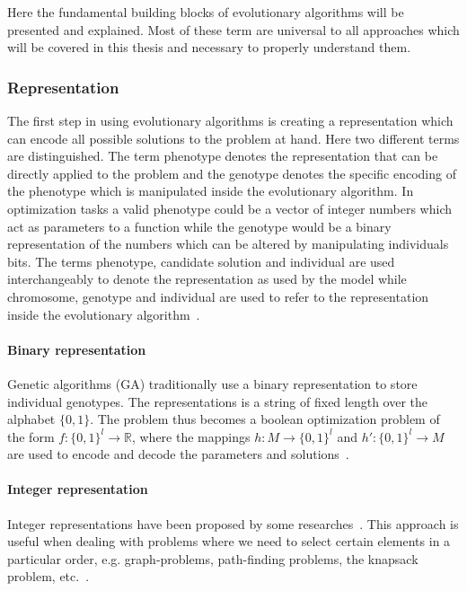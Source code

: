 Here the fundamental building blocks of evolutionary algorithms will be presented and explained. Most of these term are universal to all approaches which will be covered in this thesis and necessary to properly understand them.

\subsubsection{Representation}

The first step in using evolutionary algorithms is creating a representation which can encode all possible solutions to the problem at hand. Here two different terms are distinguished. The term phenotype denotes the representation that can be directly applied to the problem and the genotype denotes the specific encoding of the phenotype which is manipulated inside the evolutionary algorithm. In optimization tasks a valid phenotype could be a vector of integer numbers which act as parameters to a function while the genotype would be a binary representation of the numbers which can be altered by manipulating individuals bits. The terms phenotype, candidate solution and individual are used interchangeably to denote the representation as used by the model while chromosome, genotype and individual are used to refer to the representation inside the evolutionary algorithm~\cite{Eiben2015_whatevolutionary}.

\paragraph{Binary representation}

Genetic algorithms (GA) traditionally use a binary representation to store individual genotypes. The representations is a string of fixed length over the alphabet $\{0,1\}$. The problem thus becomes a boolean optimization problem of the form $ f:\{0,1\}^l \rightarrow \mathbb{R}$, where the mappings $h:M \rightarrow \{0,1\}^l$ and $h':\{0,1\}^l \rightarrow M$ are used to encode and decode the parameters and solutions~\cite{back1997evolutionary}.

\paragraph{Integer representation}

Integer representations have been proposed by some researches~\cite{unter611evolutionary}. This approach is useful when dealing with problems where we need to select certain elements in a particular order, e.g. graph-problems, path-finding problems, the knapsack problem, etc.~\cite{Eiben201511}.


